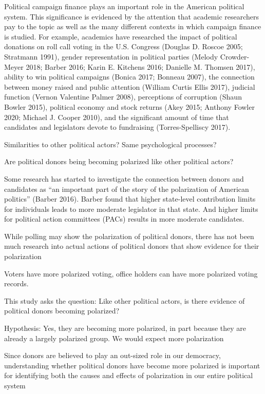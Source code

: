 \documentclass[11pt,]{article}
\begin{document}
\vskip -8.5pt



\noindent \doublespacing 

Political campaign finance plays an important role in the American
political system. This significance is evidenced by the attention that
academic researchers pay to the topic as well as the many different
contexts in which campaign finance is studied. For example, academics
have researched the impact of political donations on roll call voting in
the U.S. Congress (Douglas D. Roscoe 2005; Stratmann 1991), gender
representation in political parties (Melody Crowder-Meyer 2018; Barber
2016; Karin E. Kitchens 2016; Danielle M. Thomsen 2017), ability to win
political campaigns (Bonica 2017; Bonneau 2007), the connection between
money raised and public attention (William Curtis Ellis 2017), judicial
function (Vernon Valentine Palmer 2008), perceptions of corruption
(Shaun Bowler 2015), political economy and stock returns (Akey 2015;
Anthony Fowler 2020; Michael J. Cooper 2010), and the significant amount
of time that candidates and legislators devote to fundraising
(Torres-Spelliscy 2017).

Similarities to other political actors? Same psychological processes?

Are political donors being becoming polarized like other political
actors?

Some research has started to investigate the connection between donors
and candidates as ``an important part of the story of the polarization
of American politics'' (Barber 2016). Barber found that higher
state-level contribution limits for individuals leads to more moderate
legislator in that state. And higher limits for political action
committees (PACs) results in more moderate candidates.

While polling may show the polarization of political donors, there has
not been much research into actual actions of political donors that show
evidence for their polarization

Voters have more polarized voting, office holders can have more
polarized voting records.

This study asks the question: Like other political actors, is there
evidence of political donors becoming polarized?

Hypothesis: Yes, they are becoming more polarized, in part because they
are already a largely polarized group. We would expect more polarization

Since donors are believed to play an out-sized role in our democracy,
understanding whether political donors have become more polarized is
important for identifying both the causes and effects of polarization in
our entire political system
\end{document}
